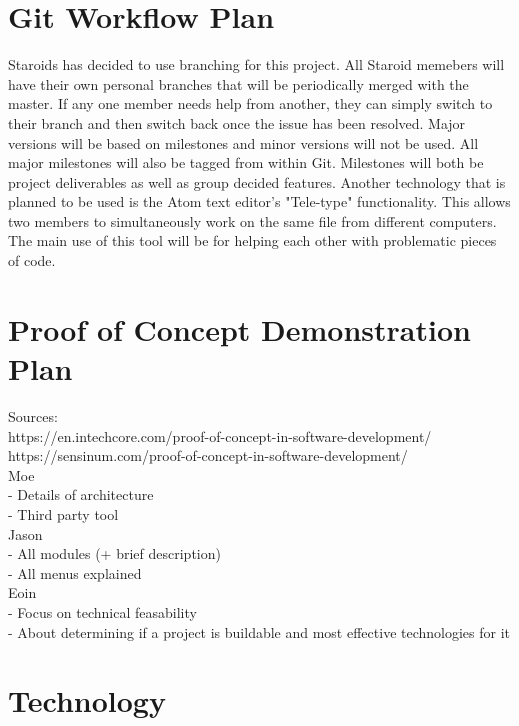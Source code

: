 \documentclass{article}
\begin{document}
\section{Git Workflow Plan}
Staroids has decided to use branching for this project. All Staroid memebers will have their own personal branches that will be periodically merged with the master. If any one member needs help from another, they can simply switch to their branch and then switch back once the issue has been resolved. Major versions will be based on milestones and minor versions will not be used. All major milestones will also be tagged from within Git. Milestones will both be project deliverables as well as group decided features. Another technology that is planned to be used is the Atom text editor's "Tele-type" functionality. This allows two members to simultaneously work on the same file from different computers. The main use of this tool will be for helping each other with problematic pieces of code.\\

\section{Proof of Concept Demonstration Plan}

Sources:\\ https://en.intechcore.com/proof-of-concept-in-software-development/\\ https://sensinum.com/proof-of-concept-in-software-development/\\

Moe\\
- Details of architecture\\
- Third party tool\\

Jason\\
- All modules (+ brief description)\\
- All menus explained\\

Eoin\\
- Focus on technical feasability\\
- About determining if a project is buildable and most effective technologies for it\\

\section{Technology}
\end{document}
